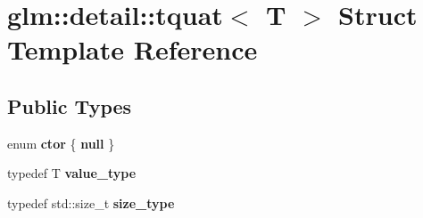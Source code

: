 \hypertarget{structglm_1_1detail_1_1tquat}{}\section{glm\+:\+:detail\+:\+:tquat$<$ T $>$ Struct Template Reference}
\label{structglm_1_1detail_1_1tquat}
\subsection*{Public Types}
\begin{DoxyCompactItemize}
\item 
\hypertarget{structglm_1_1detail_1_1tquat_a61a530a53df553ec85f45e6b5ce6d7c3}{}enum {\bfseries ctor} \{ {\bfseries null}
 \}\label{structglm_1_1detail_1_1tquat_a61a530a53df553ec85f45e6b5ce6d7c3}

\item 
\hypertarget{structglm_1_1detail_1_1tquat_a32846d2b5305ba522a7f278c47c59a4f}{}typedef T {\bfseries value\+\_\+type}\label{structglm_1_1detail_1_1tquat_a32846d2b5305ba522a7f278c47c59a4f}

\item 
\hypertarget{structglm_1_1detail_1_1tquat_a05ffe74d48f5fb0789427706d209ffdc}{}typedef std\+::size\+\_\+t {\bfseries size\+\_\+type}\label{structglm_1_1detail_1_1tquat_a05ffe74d48f5fb0789427706d209ffdc}

\end{DoxyCompactItemize}
